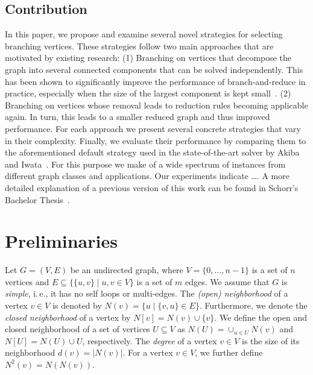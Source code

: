 \documentclass[a4paper,UKenglish,cleveref, autoref, thm-restate]{lipics-v2021}
\newcommand{\ie}{i.\,e.,\xspace}
\begin{document}
\subsection{Contribution}
In this paper, we propose and examine several novel strategies for selecting branching vertices.
These strategies follow two main approaches that are motivated by existing research: (1) Branching on vertices that decompose the graph into several connected components that can be solved independently.
This has been shown to significantly improve the performance of branch-and-reduce in practice, especially when the size of the largest component is kept small~\cite{alsahafy2020computing}.
(2) Branching on vertices whose removal leads to reduction rules becoming applicable again.
In turn, this leads to a smaller reduced graph and thus improved performance.
For each approach we present several concrete strategies that vary in their complexity.
Finally, we evaluate their performance by comparing them to the aforementioned default strategy used in the state-of-the-art solver by Akiba and Iwata~\cite{AkibaIwata}.
For this purpose we make of a wide spectrum of instances from different graph classes and applications.
Our experiments indicate \ldots {}.
A more detailed explanation of a previous version of this work
can be found in Schorr's Bachelor Thesis~\cite{schorr2020improved}.

\section{Preliminaries}
Let $G=(V,E)$ be an undirected graph, where $V = \{0, \ldots, n-1\}$ is a set of $n$ vertices and $E \subseteq  \{\{u,v\} \mid u,v \in V\}$ is a set of $m$ edges. 
We assume that $G$ is \emph{simple}, \ie it has no self loops or multi-edges.
The \emph{(open) neighborhood} of a vertex $v \in V$ is denoted by $N(v) = \{u \mid \{v,u\} \in E\}$.
Furthermore, we denote the \emph{closed neighborhood} of a vertex by $N[v]=N(v) \cup \{v\}$.
We define the open and closed neighborhood of a set of vertices $U \subseteq V$
as $N(U) = \cup_{u \in U} N(v)$ and $N[U] = N(U) \cup U$, respectively.
The \emph{degree} of a vertex $v \in V$ is the size of its neighborhood $d(v) = |N(v)|$.
For a vertex $v \in V$, we further define $N^2(v) = N(N(v))$.
\end{document}

